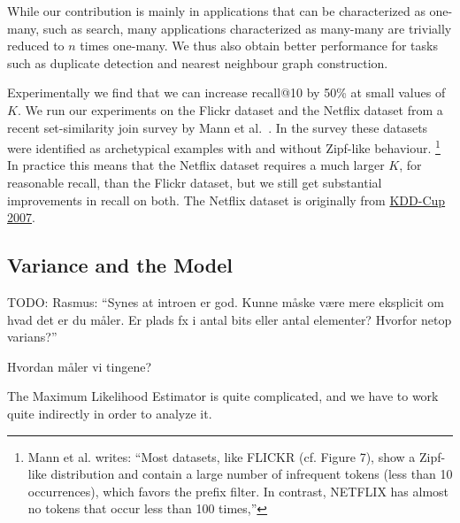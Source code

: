While our contribution is mainly in applications that can be characterized as one-many, such as search, many applications characterized as many-many are trivially reduced to $n$ times one-many.
We thus also obtain better performance for tasks such as duplicate detection and nearest neighbour graph construction.

Experimentally we find that we can increase recall@10 by 50\% at small values of $K$.
We run our experiments on the Flickr dataset and the Netflix dataset from a recent set-similarity join survey by Mann et al.~\cite{mann2016empirical}.
In the survey these datasets were identified as archetypical examples with and without Zipf-like behaviour.
\footnote{Mann et al. writes:
 ``Most datasets, like FLICKR (cf. Figure 7), show a Zipf-like
 distribution and contain a large number of infrequent tokens (less
 than 10 occurrences), which favors the prefix filter. In contrast,
 NETFLIX has almost no tokens that occur less than 100 times,''
 }
In practice this means that the Netflix dataset requires a much larger $K$, for reasonable recall, than the Flickr dataset, but we still get substantial improvements in recall on both.
The Netflix dataset is originally from \href{https://www.cs.uic.edu/~liub/Netflix-KDD-Cup-2007.html}{KDD-Cup 2007}.

\subsection{Variance and the Model}

TODO: Rasmus: ``Synes at introen er god. Kunne måske være mere eksplicit om hvad det er du måler. Er plads fx i antal bits eller antal elementer? Hvorfor netop varians?''

Hvordan måler vi tingene?

The Maximum Likelihood Estimator is quite complicated, and we have to work quite indirectly in order to analyze it.

